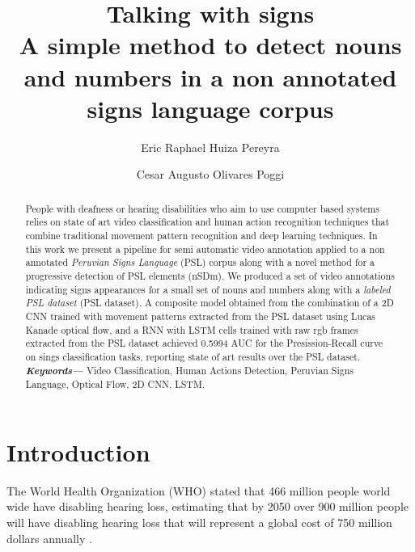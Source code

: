 \documentclass[twocolumn,conference]{article}
\providecommand{\keywords}[1]
{
  \small	
  \textbf{\textit{Keywords---}} #1
}
\begin{document}
\author[1]{Eric Raphael Huiza Pereyra}

\author[2]{Cesar Augusto Olivares Poggi}

\title{%
	\vspace{-2.0cm}
	\textbf{Talking with signs} \\	
	\Large \textbf{A simple method to detect nouns and numbers in a non annotated signs language corpus}
}

\maketitle
    
\begin{abstract}
People with deafness or hearing disabilities who aim to use computer based systems relies on state of art video classification and human action recognition techniques that combine traditional movement pattern recognition and deep learning techniques. In this work we present a pipeline for semi automatic video annotation applied to a non annotated \textit{Peruvian Signs Language} (PSL) corpus along with a novel method for a progressive detection of PSL elements (nSDm). We produced a set of video annotations indicating signs appearances for a small set of nouns and numbers along with a \textit{labeled PSL dataset} (PSL dataset). A composite model obtained from the combination of a 2D CNN trained with movement patterns extracted from the PSL dataset using Lucas Kanade optical flow, and a RNN with LSTM cells trained with raw rgb frames extracted from the PSL dataset achieved 0.5994 AUC for the Presission-Recall curve on sings classification tasks, reporting state of art results over the PSL dataset. \\
\keywords{Video Classification, Human Actions Detection, Peruvian Signs Language, Optical Flow, 2D CNN, LSTM.}
\end{abstract}

\section{Introduction}\label{intro}
The World Health Organization (WHO) stated that 466 million people world wide have disabling hearing loss, estimating that by 2050 over 900 million people will have disabling hearing loss that will represent a global cost of 750 million dollars annually \cite{deafness_and_hearing_loss_2019}. 
\end{document}
